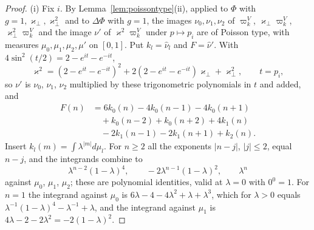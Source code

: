 \documentclass[aps,prd,twocolumn,superscriptaddress,nofootinbib,longbibliography,floatfix,amsmath,amssymb,10pt]{revtex4-2}
\theoremstyle{definition}
\theoremstyle{remark}
\begin{document}
\begin{proof}
(i) Fix $i$. By Lemma~\ref{lem:poissontype}(ii), applied to $\Phi$ with
$g=1,\varkappa_\perp,\varkappa_\perp^2$ and to $\Delta\Phi$ with $g=1$, the
images $\nu_0,\nu_1,\nu_2$ of $\varpi^V_k$, $\varkappa_\perp\varpi^V_k$,
$\varkappa_\perp^2\varpi^V_k$ and the image $\nu'$ of $\varkappa^2
\varpi^V_k$ under $p\mapsto p_i$ are of Poisson type, with measures
$\mu_0,\mu_1,\mu_2,\mu'$ on $[0,1]$. Put $k_l=\hat\nu_l$ and $F=\hat\nu'$.
With $4\sin^2(t/2)=2-e^{it}-e^{-it}$,
\[
\varkappa^2=(2-e^{it}-e^{-it})^2+2(2-e^{it}-e^{-it})\varkappa_\perp+
\varkappa_\perp^2 ,\qquad t=p_i,
\]
so $\nu'$ is $\nu_0$, $\nu_1$, $\nu_2$ multiplied by these trigonometric
polynomials in $t$ and added, and
\[
\begin{split}
F(n)&=6k_0(n)-4k_0(n-1)-4k_0(n+1)\\
&\quad+k_0(n-2)+k_0(n+2)+4k_1(n)\\
&\quad-2k_1(n-1)-2k_1(n+1)+k_2(n) .
\end{split}
\]
Insert $k_l(m)=\int\lambda^{|m|}d\mu_l$. For $n\ge2$ all the exponents
$|n-j|$, $|j|\le2$, equal $n-j$, and the integrands combine to
\[
\lambda^{n-2}(1-\lambda)^4,\qquad-2\lambda^{n-1}(1-\lambda)^2,\qquad
\lambda^n
\]
against $\mu_0$, $\mu_1$, $\mu_2$; these are polynomial identities, valid
at $\lambda=0$ with $0^0=1$. For $n=1$ the integrand against $\mu_0$ is
$6\lambda-4-4\lambda^2+\lambda+\lambda^3$, which for $\lambda>0$ equals
$\lambda^{-1}(1-\lambda)^4-\lambda^{-1}+\lambda$, and the integrand against
$\mu_1$ is $4\lambda-2-2\lambda^2=-2(1-\lambda)^2$.


\end{proof}
\end{document}
